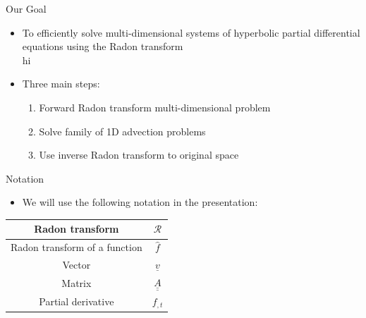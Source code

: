 \documentclass{beamer}
\newcommand{\bunderline}[1]{\underline{#1}}
\renewcommand{\vec}[1]{{\bunderline{#1}}}
\newcommand{\mat}[1]{{\bunderline{\bunderline{#1}}}}
\begin{document}
\begin{frame}{Our Goal}
    \begin{itemize}
        \item
            To efficiently solve multi-dimensional systems of hyperbolic partial differential equations using the Radon transform
            \\ \color{white} hi \color{black} \\
        \item
            Three main steps:
        \begin{enumerate}
            \item
                Forward Radon transform multi-dimensional problem
            \item
                Solve family of 1D advection problems 
            \item
                Use inverse Radon transform to original space
        \end{enumerate}
    \end{itemize}
\end{frame}

\begin{frame}{Notation}
    \begin{itemize}
        \item
            We will use the following notation in the presentation:
    \end{itemize}
    \begin{center}
        \begin{tabular}{| c | c |}
        \hline
        Radon transform & $\mathcal{R}$ \\
        \hline
        Radon transform of a function & $\widehat{f}$ \\
        \hline
        Vector & $\vec{v}$ \\
        \hline
        Matrix & $\mat{A}$ \\
        \hline
        Partial derivative & $f_{, t}$ \\
        \hline
        \end{tabular}
    \end{center}
\end{frame}
\end{document}
